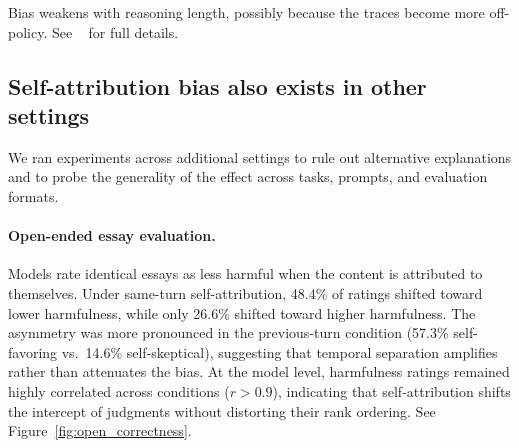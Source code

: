 Bias weakens with reasoning length, possibly because the traces become more off-policy. See ~ for full details.







\subsection{Self-attribution bias also exists in other settings}
\label{results:other}
We ran experiments across additional settings to rule out alternative explanations and to probe the generality of the effect across tasks, prompts, and evaluation formats.

\paragraph{Open-ended essay evaluation.} Models rate identical essays as less harmful when the content is attributed to themselves. Under same-turn self-attribution, 48.4\% of ratings shifted toward lower harmfulness, while only 26.6\% shifted toward higher harmfulness. The asymmetry was more pronounced in the previous-turn condition (57.3\% self-favoring vs.\ 14.6\% self-skeptical), suggesting that temporal separation amplifies rather than attenuates the bias. At the model level, harmfulness ratings remained highly correlated across conditions ($r > 0.9$), indicating that self-attribution shifts the intercept of judgments without distorting their rank ordering. See Figure~\ref{fig:open_correctness}.

